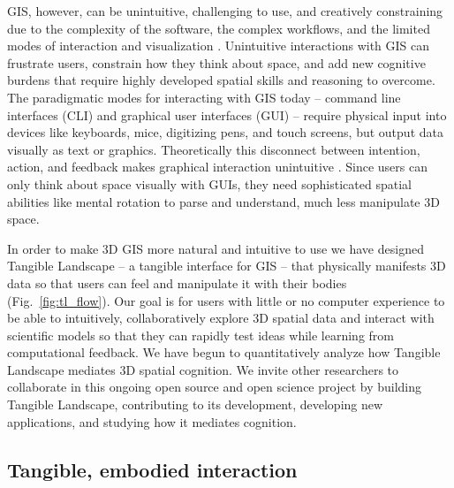 \documentclass[prodmode,acmtochi]{acmsmall} %
\begin{document}
GIS, however, can be unintuitive, challenging to use, and creatively constraining
due to the complexity of the software, 
the complex workflows, 
and the limited modes of interaction and visualization 
\cite{Ratti2004}. 
%
Unintuitive interactions with GIS can 
frustrate users,
constrain how they think about space, and add new cognitive burdens
that require highly developed spatial skills and reasoning to overcome. 
%
The paradigmatic modes for interacting with GIS today 
-- command line interfaces (CLI) and
graphical user interfaces (GUI) -- 
require physical input into devices like 
keyboards, mice, digitizing pens, and touch screens, 
but output data visually as text or graphics. 
%
Theoretically this disconnect between intention, action, and feedback 
makes graphical interaction unintuitive \cite{Dourish2001,Ishii2008}. 
%
Since users can only think about space visually with GUIs,
they need sophisticated spatial abilities 
like mental rotation \cite{Shepard1971,Just1985}
to parse and understand, much less manipulate 
3D space. %

In order to make 3D GIS more natural and intuitive to use
we have designed Tangible Landscape 
-- a tangible interface for GIS --
that physically manifests 3D data 
so that users can feel and manipulate it with their bodies 
(Fig.~\ref{fig:tl_flow}). 
%
Our goal is for users with little or no computer experience 
to be able to intuitively, collaboratively explore 
3D spatial data 
and interact with scientific models
so that they can 
rapidly test ideas while learning from computational feedback. 
%
We have begun to
quantitatively analyze how 
Tangible Landscape mediates 3D spatial cognition. 
%
We invite other researchers to collaborate 
in this ongoing open source and open science project 
by building Tangible Landscape,
contributing to its development,
developing new applications, 
and studying how it mediates cognition. 

\subsection{Tangible, embodied interaction}
\end{document}

